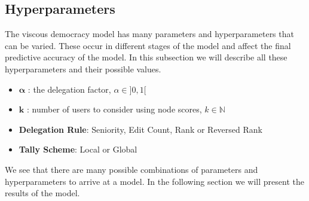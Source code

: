 \subsection{Hyperparameters}
The viscous democracy model has many parameters and hyperparameters that can be varied. These occur in different stages of the model and affect the final predictive accuracy of the model. In this subsection we will describe all these hyperparameters and their possible values.

\begin{itemize}
    \item $\boldsymbol{\alpha}$ : the delegation factor, $\alpha\in ]0,1[$
    \item $\mathbf{k}$ : number of users to consider using node scores, $k \in \mathbb{N}$
    \item \textbf{Delegation Rule}: Seniority, Edit Count, Rank or Reversed Rank 
    \item \textbf{Tally Scheme}: Local or Global
\end{itemize}
We see that there are many possible combinations of parameters and hyperparameters to arrive at a model. In the following section we will present the results of the model. 